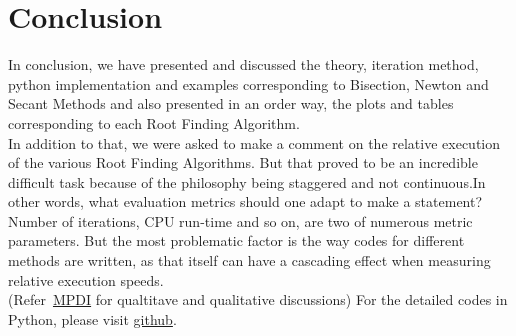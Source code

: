 \documentclass[a4paper, 12pt]{report}
\begin{document}
\chapter{Conclusion}
In conclusion, we have presented and discussed the theory, iteration method, python implementation and examples corresponding to Bisection, Newton and Secant Methods and also presented in an order way, the plots and tables corresponding to each Root Finding Algorithm.\\
In addition to that, we were asked to make a comment on the relative execution of the various Root Finding Algorithms. But that proved to be an incredible difficult task because of the philosophy being staggered and not continuous.In other words, what evaluation metrics should one adapt to make a statement? Number of iterations, CPU run-time and so on, are two of numerous metric parameters. But the most problematic factor is the way codes for different methods are written, as that itself can have a cascading effect when measuring relative execution speeds.\\
(Refer~\href{https://www.mdpi.com/2227-7390/9/11/1306/htm}{MPDI} for qualtitave and qualitative discussions)
For the detailed codes in Python, please visit \href{https://github.com/YashIITM/Linear-Regression-Using-Octave-and-Python}{github}.

    \printbibliography

    \appendix

  
\end{document}
